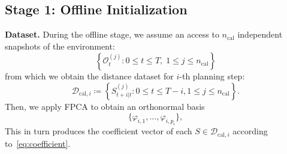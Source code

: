 \documentclass[lettersize,journal]{IEEEtran}
\begin{document}


\subsection{Stage 1: Offline Initialization}
\label{subsec:offline_online_cp}

\noindent
{\bf Dataset.} During the offline stage, we assume an access to $n_{\text{cal}}$ independent snapshots of the environment:
\begin{equation*}
\left\{ \mathcal{O}^{(j)}_t : 0 \leq t \leq T,\; 1 \leq j \leq  n_{\text{cal}}  \right\}
\end{equation*}
from which we obtain the distance dataset for $i$-th planning step:
\begin{equation*}
\mathcal{D}_{\mathrm{cal},i} \coloneqq
\left\{S_{t+i|t}^{(j)}: 0\leq t \leq T - i, 1 \leq j \leq n_{\text{cal}} \right\}.
\end{equation*}
Then, we apply FPCA to obtain an orthonormal basis
\begin{equation*}
\{\varphi_{i,1},\dots,\varphi_{i,p_i}\},
\end{equation*}
This in turn produces the coefficient vector of each $S \in \mathcal{D}_{\text{cal}, i}$ according to~\eqref{eq:coefficient}.
\end{document}
